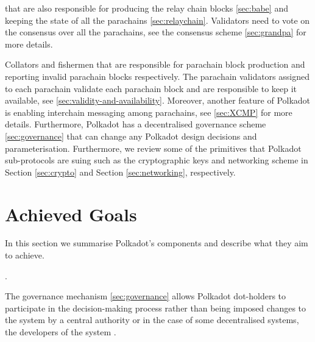  that are also responsible for producing the relay chain blocks \ref{sec:babe} and keeping the state of all the parachains \ref{sec:relaychain}.
Validators need to vote on the consensus over all the parachains, see the consensus scheme \ref{sec:grandpa} for more details.

Collators and fishermen that are responsible for parachain block production  and reporting invalid parachain blocks respectively.
The parachain validators assigned to each parachain validate each parachain block and are responsible to keep it available, see \ref{sec:validity-and-availability}. Moreover, another feature of Polkadot is enabling interchain messaging among parachains, see \ref{sec:XCMP} for more details.
Furthermore, Polkadot has a decentralised governance scheme \ref{sec:governance} that can change any Polkadot design decisions and parameterisation.
Furthermore, we review some of the primitives that Polkadot sub-protocols are suing such as the cryptographic keys and networking scheme in Section \ref{sec:crypto} and Section \ref{sec:networking}, respectively. 









\section{Achieved Goals}\label{sec:summary}
In this section we summarise Polkadot's components and describe what they aim to achieve. 



 

 . 



The governance mechanism \ref{sec:governance} allows Polkadot dot-holders to participate in the decision-making process rather than being imposed changes to the system by a central authority or in the case of some decentralised systems, the developers of the system .  


